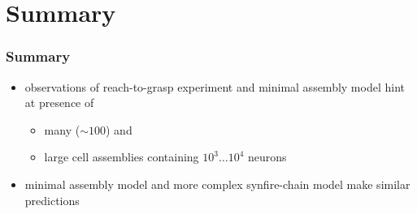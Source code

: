 \documentclass[8pt,t,usepdftitle=false]{beamer}
\begin{document}
\def\ttl{Summary}
\section{\ttl}
\begin{frame}[plain]
  \frametitle{\ttl}
  \begin{itemize}\itemsep1ex
  \item<1-> observations of reach-to-grasp experiment and minimal assembly model hint at presence of
    \begin{itemize}
    \item many ($\sim{}100$) and
    \item large cell assemblies containing $10^3\ldots{}10^4$ neurons
    \end{itemize}
  \item<2-> minimal assembly model and more complex synfire-chain model make similar predictions
  \end{itemize}
  \vspace*{2ex}
  \end{frame}
\end{document}

